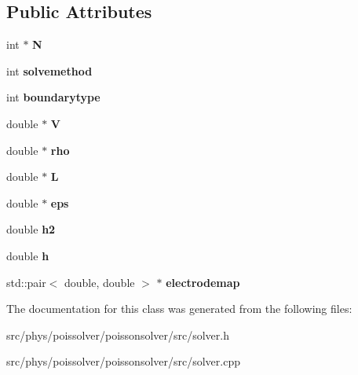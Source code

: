 \subsection*{Public Attributes}
\begin{DoxyCompactItemize}
\item 
int $\ast$ {\bfseries N}\hypertarget{classSolver_a543cef6df4261245fa40d30f9b727d60}{}\label{classSolver_a543cef6df4261245fa40d30f9b727d60}

\item 
int {\bfseries solvemethod}\hypertarget{classSolver_aa76b0e2cf4871cc1936451a9037ada30}{}\label{classSolver_aa76b0e2cf4871cc1936451a9037ada30}

\item 
int {\bfseries boundarytype}\hypertarget{classSolver_af72c9d151bd70d33c0700c4e5ffec6ed}{}\label{classSolver_af72c9d151bd70d33c0700c4e5ffec6ed}

\item 
double $\ast$ {\bfseries V}\hypertarget{classSolver_a4dff3173b431f1c6989efe3510331603}{}\label{classSolver_a4dff3173b431f1c6989efe3510331603}

\item 
double $\ast$ {\bfseries rho}\hypertarget{classSolver_a39d4f60391c4c6b58ffc70cd29a48921}{}\label{classSolver_a39d4f60391c4c6b58ffc70cd29a48921}

\item 
double $\ast$ {\bfseries L}\hypertarget{classSolver_a3356ba94b805f34af408ddee10461994}{}\label{classSolver_a3356ba94b805f34af408ddee10461994}

\item 
double $\ast$ {\bfseries eps}\hypertarget{classSolver_a4535d93397fe5545954971c831b960af}{}\label{classSolver_a4535d93397fe5545954971c831b960af}

\item 
double {\bfseries h2}\hypertarget{classSolver_af80ed186f40803cd3ba6998fae2818b0}{}\label{classSolver_af80ed186f40803cd3ba6998fae2818b0}

\item 
double {\bfseries h}\hypertarget{classSolver_a8cc4b2bf572c6efa2a06b63af5259d6e}{}\label{classSolver_a8cc4b2bf572c6efa2a06b63af5259d6e}

\item 
std\+::pair$<$ double, double $>$ $\ast$ {\bfseries electrodemap}\hypertarget{classSolver_a9af6d11b188e12844a9ab32697f5d153}{}\label{classSolver_a9af6d11b188e12844a9ab32697f5d153}

\end{DoxyCompactItemize}


The documentation for this class was generated from the following files\+:\begin{DoxyCompactItemize}
\item 
src/phys/poissolver/poissonsolver/src/solver.\+h\item 
src/phys/poissolver/poissonsolver/src/solver.\+cpp\end{DoxyCompactItemize}
